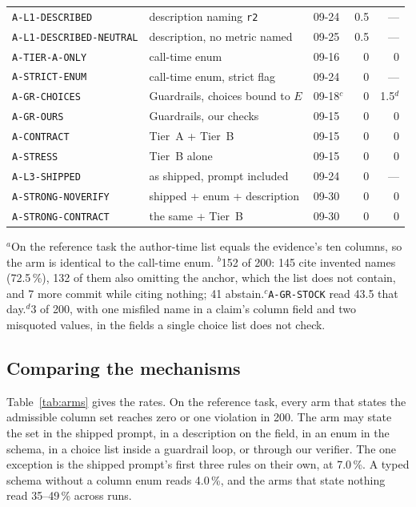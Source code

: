 \documentclass[smallextended,natbib]{svjour3}
\begin{document}
\begin{table}[!htbp]
{\begin{tabular}{@{}lllrr@{}}
\texttt{A-L1-DESCRIBED}      & description naming \texttt{r2} & 09-24 & 0.5 & --- \\
\texttt{A-L1-DESCRIBED-NEUTRAL} & description, no metric named & 09-25 & 0.5 & --- \\
\texttt{A-TIER-A-ONLY}       & call-time enum             & 09-16 & 0 & 0 \\
\texttt{A-STRICT-ENUM}       & call-time enum, strict flag & 09-24 & 0 & --- \\
\texttt{A-GR-CHOICES}        & Guardrails, choices bound to $E$ & 09-18$^{c}$ & 0 & 1.5$^{d}$ \\
\midrule
\texttt{A-GR-OURS}           & Guardrails, our checks     & 09-15 & 0 & 0 \\
\texttt{A-CONTRACT}          & Tier~A + Tier~B            & 09-15 & 0 & 0 \\
\texttt{A-STRESS}            & Tier~B alone               & 09-15 & 0 & 0 \\
\texttt{A-L3-SHIPPED}        & as shipped, prompt included & 09-24 & 0 & --- \\
\midrule
\texttt{A-STRONG-NOVERIFY}   & shipped + enum + description & 09-30 & 0 & 0 \\
\texttt{A-STRONG-CONTRACT}   & the same + Tier~B          & 09-30 & 0 & 0 \\
\bottomrule
\end{tabular}}

\vspace{2pt}
{\footnotesize $^{a}$On the reference task the author-time list equals the
evidence's ten columns, so the arm is identical to the call-time enum.\quad
$^{b}$152 of 200: 145 cite invented names (72.5\,\%), 132 of them also
omitting the anchor, which the list does not contain, and 7 more commit while
citing nothing; 41 abstain.\quad $^{c}$\texttt{A-GR-STOCK} read
43.5 that day.\quad $^{d}$3 of 200, with one misfiled name in a claim's column
field and two misquoted values, in the fields a single choice list does not
check.}
\end{table}

\subsection{Comparing the mechanisms}

Table~\ref{tab:arms} gives the rates. On the reference task, every arm that
states the admissible column set reaches zero or one violation in 200. The arm
may state the set in the shipped prompt, in a description on the field, in an
enum in the schema, in a choice list inside a guardrail loop, or through our
verifier. The one exception is the shipped prompt's first three rules on their
own, at 7.0\,\%. A typed schema without a column enum reads 4.0\,\%, and the
arms that state nothing read 35--49\,\% across runs.
\end{document}
